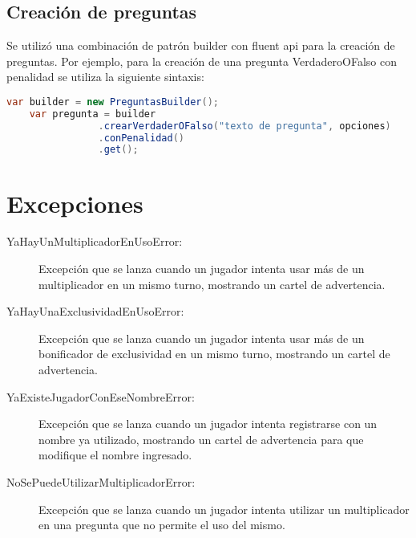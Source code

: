 \documentclass[titlepage,a4paper]{article}
\begin{document}
\subsection{Creación de preguntas} Se utilizó una combinación de patrón builder con fluent api para la creación de preguntas. Por ejemplo, para la creación de una pregunta VerdaderoOFalso con penalidad se utiliza la siguiente sintaxis:
\begin{lstlisting}[language=java]
    var builder = new PreguntasBuilder();
    var pregunta = builder
                .crearVerdaderOFalso("texto de pregunta", opciones)
                .conPenalidad()
                .get();
\end{lstlisting}




\section{Excepciones}\label{sec:excepciones}

\begin{description}
\item[YaHayUnMultiplicadorEnUsoError:] Excepción que se lanza cuando un jugador intenta usar más de un multiplicador en un mismo turno, mostrando un cartel de advertencia.

\end{description}

\begin{description}
\item[YaHayUnaExclusividadEnUsoError:] Excepción que se lanza cuando un jugador intenta usar más de un bonificador de exclusividad en un mismo turno, mostrando un cartel de advertencia.

\end{description}

\begin{description}
\item[YaExisteJugadorConEseNombreError:] Excepción que se lanza cuando un jugador intenta registrarse con un nombre ya utilizado, mostrando un cartel de advertencia para que modifique el nombre ingresado.

\end{description}

\begin{description}
\item[NoSePuedeUtilizarMultiplicadorError:] Excepción que se lanza cuando un jugador intenta utilizar un multiplicador en una pregunta que no permite el uso del mismo.

\end{description}
\end{document}
